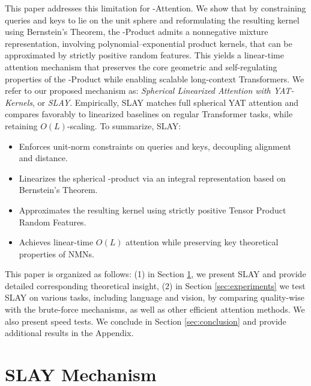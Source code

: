 \documentclass{article}
\DeclareRobustCommand{\E}{\text{\normalfont\tifinaghfont ⵟ}}
\begin{document}
This paper addresses this limitation for \E-Attention. We show that by constraining queries and keys to lie on the unit sphere and reformulating the resulting kernel using Bernstein’s Theorem, the \E-Product admits a nonnegative mixture representation, involving polynomial--exponential product kernels, that can be approximated by strictly positive random features. This yields a linear-time attention mechanism that preserves the core geometric and self-regulating properties of the \E-Product while enabling scalable long-context Transformers. We refer to our proposed mechanism as: \emph{Spherical Linearized Attention with YAT-Kernels}, or \emph{SLAY}. Empirically, SLAY matches full spherical YAT attention and compares favorably to linearized baselines on regular Transformer tasks, while retaining $O(L)$-scaling. To summarize, SLAY:
\vspace{-2mm}
\begin{itemize}[leftmargin=1.4em]
\item Enforces unit-norm constraints on queries and keys, decoupling alignment and distance.
\vspace{-1mm}
\item Linearizes the spherical \E-product via an integral representation based on Bernstein’s Theorem.
\vspace{-1mm}
\item Approximates the resulting kernel using strictly positive Tensor Product Random Features.
\vspace{-1mm}
\item Achieves linear-time $O(L)$ attention while preserving key theoretical properties of NMNs.
\end{itemize}
\vspace{-2mm}
This paper is organized as follows: (1) in Section \ref{sec:method}, we present SLAY and provide detailed corresponding theoretical insight, (2) in Section \ref{sec:experiments} we test SLAY on various tasks, including language and vision, by comparing quality-wise with the brute-force mechanisms, as well as other efficient attention methods. We also present speed tests. We conclude in Section \ref{sec:conclusion} and provide additional results in the Appendix.

\section{SLAY Mechanism}
\label{sec:method}
\end{document}

